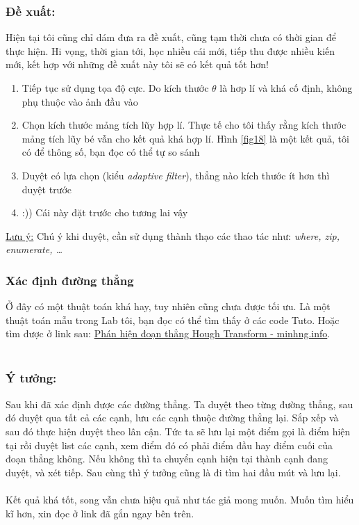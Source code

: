 \documentclass{article}
\begin{document}
    \subsubsection*{Đề xuất:} Hiện tại tôi cũng chỉ dám đưa ra đề xuất, cũng tạm thời chưa có thời gian để thực hiện. Hi vọng, thời gian tới, học nhiều cái mới, tiếp thu được nhiều kiến mới, kết hợp với những đề xuất này tôi sẽ có kết quả tốt hơn!
    \begin{enumerate}
        \item Tiếp tục sử dụng tọa độ cực. Do kích thước $\theta$ là hơp lí và khá cố định, không phụ thuộc vào ảnh đầu vào
        \item Chọn kích thước mảng tích lũy hợp lí. Thực tế cho tôi thấy rằng kích thước mảng tích lũy bé vẫn cho kết quả khá hợp lí. Hình \ref{fig18} là một kết quả, tôi có để thông số, bạn đọc có thể tự so sánh
        \item Duyệt có lựa chọn (kiểu \textit{adaptive filter}), thẳng nào kích thước ít hơn thì duyệt trước
        \item :)) Cái này đặt trước cho tương lai vậy
    \end{enumerate}
    \underline{Lưu ý:} Chú ý khi duyệt, cần sử dụng thành thạo các thao tác như: \textit{where, zip, enumerate, \ldots}
    \subsubsection{Xác định đường thẳng}
    Ở đây có một thuật toán khá hay, tuy nhiên cũng chưa được tối ưu. Là một thuật toán mẫu trong Lab tôi, bạn đọc có thể tìm thấy ở các code Tuto. Hoặc tìm được ở link sau: \href{https://minhng.info/tutorials/phat-hien-doan-thang-hough-transform.html}{Phán hiện đoạn thẳng Hough Transform - minhng.info}.\\\\
    \subsubsection*{Ý tưởng:} Sau khi đã xác định được các đường thẳng. Ta duyệt theo từng đường thẳng, sau đó duyệt qua tất cả các cạnh, lưu các cạnh thuộc đường thẳng lại. Sắp xếp và sau đó thực hiện duyệt theo lân cận. Tức ta sẽ lưu lại một điểm gọi là điểm hiện tại rồi duyệt list các cạnh, xem điểm đó có phải điểm đầu hay điểm cuối của đoạn thẳng không. Nếu không thì ta chuyển cạnh hiện tại thành cạnh đang duyệt, và xét tiếp. Sau cùng thì ý tưởng cũng là đi tìm hai đầu mút và lưu lại.\\\\
    Kết quả khá tốt, song vẫn chưa hiệu quả như tác giả mong muốn. Muốn tìm hiểu kĩ hơn, xin đọc ở link đã gắn ngay bên trên.
\end{document}
